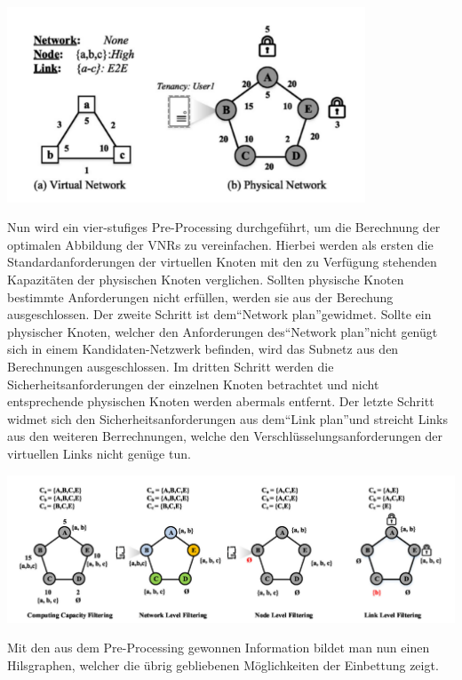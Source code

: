 \documentclass{lni}
\begin{document}
\begin{center}
	\includegraphics[width=0.8\textwidth]{SVNR.pdf}\newline
\end{center}
Nun wird ein vier-stufiges Pre-Processing durchgeführt, um die Berechnung der optimalen Abbildung der VNRs zu vereinfachen. Hierbei werden als ersten die Standardanforderungen der virtuellen Knoten mit den zu Verfügung stehenden Kapazitäten der physischen Knoten verglichen. Sollten physische Knoten bestimmte Anforderungen nicht erfüllen, werden sie aus der Berechung ausgeschlossen. Der zweite Schritt ist dem"`Network plan"'gewidmet. Sollte ein physischer Knoten, welcher den Anforderungen des"`Network plan"'nicht genügt sich in einem Kandidaten-Netzwerk befinden, wird das Subnetz aus den Berechnungen ausgeschlossen. Im dritten Schritt werden die Sicherheitsanforderungen der einzelnen Knoten betrachtet und nicht entsprechende physischen Knoten werden abermals entfernt. Der letzte Schritt widmet sich den Sicherheitsanforderungen aus dem"`Link plan"'und streicht Links aus den weiteren Berrechnungen, welche den Verschlüsselungsanforderungen der virtuellen Links nicht genüge tun.\newline
\begin{center}
	\includegraphics[width=1\textwidth]{pre-processing.pdf}\newline
\end{center}
Mit den aus dem Pre-Processing gewonnen Information bildet man nun einen Hilsgraphen, welcher die übrig gebliebenen Möglichkeiten der Einbettung zeigt.\newline
\end{document}
